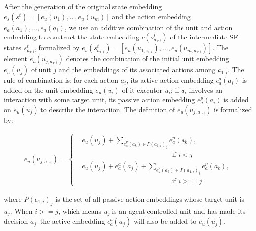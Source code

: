\documentclass[letterpaper]{article} \usepackage{aaai23}  \usepackage{times}  \usepackage{helvet}  \usepackage{courier}  \usepackage[hyphens]{url}  \usepackage{graphicx} \urlstyle{rm} \def\UrlFont{\rm}  \usepackage{natbib}  \usepackage{caption} \frenchspacing  \setlength{\pdfpagewidth}{8.5in} \setlength{\pdfpageheight}{11in} \usepackage{algorithm}
\begin{document}
After the generation of the original state embedding $e_s\left(s^t\right)=\left[e_u\left(u_1\right),...,e_u\left(u_m\right)\right]$ and the action embedding $e_a\left(a_{1}\right),...,e_a\left(a_{i}\right)$, we use an additive combination of the unit and action embedding to construct the state embedding $e\left(s_{a_{1:i}}^t\right)$ of the intermediate SE-states $s_{a_{1:i}}^t$, formalized by $e_s\left(s_{a_{1:i}}^t\right)=\left[e_u\left(u_{1,a_{1:i}}\right),\!...,e_u\left(u_{m,a_{1:i}}\right)\right]$. The element $e_u\left(u_{j,a_{1:i}}\right)$ denotes the combination of the initial unit embedding $e_u\left(u_j\right)$ of unit $j$ and the embeddings of its associated actions among $a_{1:i}$. The rule of combination is: for each action $a_i$, its active action embedding $e_a^a\left(a_i\right)$ is added on the unit embedding $e_u\left(u_i\right)$ of it executor $u_i$; if $a_i$ involves an interaction with some target unit, 
its passive action embedding $e_a^p\left(a_i\right)$ is added on $e_u\left(u_j\right)$ to describe the interaction. The definition of $e_u\left(u_{j,a_{1:i}}\right)$ is formalized by:

\vspace{-3mm}
\begin{small}
\begin{gather}
\label{update}
    e_u\left(u_{j,a_{1:i}}\right)\!=\!
    \begin{cases}
        &e_u\left(u_j\right) + 
        \sum_{e_a^p\left(a_k\right) \in P\left(a_{1:i}\right)_j}
        e_a^p\left(a_k\right),  \\
        & \ \ \ \ \ \ \ \ \ \ \ \ \ \ \ \ \ \ \ \ \ \ \ \ \ \ \ \ \ \ \ \ \ \ \ \ \ \ \ \ \ \ \ \ \ \ \ \ \ \ \ \ \ \ \ \ \ \ \ \text{if $i < j$} \\
        &e_u\left(u_j\right)\!+\!e_a^a\left(a_j\right)\!+\!
        \sum_{e_a^p\left(a_k\right) \in P\left(a_{1:i}\right)_j}
        e_a^p\left(a_k\right), \\
        & \ \ \ \ \ \ \ \ \ \ \ \ \ \ \ \ \ \ \ \ \ \ \ \ \ \ \ \ \ \ \ \ \ \ \ \ \ \ \ \ \ \ \ \ \ \ \ \ \ \ \ \ \ \ \ \ \ \ \ \text{if $i >= j$}
    \end{cases}
\end{gather}
\end{small}
where $P\left(a_{1:i}\right)_j$ is the set of all passive action embeddings whose target unit is $u_j$. When $i>=j$, which means $u_j$ is an agent-controlled unit and has made its decision $a_j$, the active embedding $e_a^a\left(a_j\right)$ will also be added to $e_u\left(u_j\right)$. 
\end{document}
